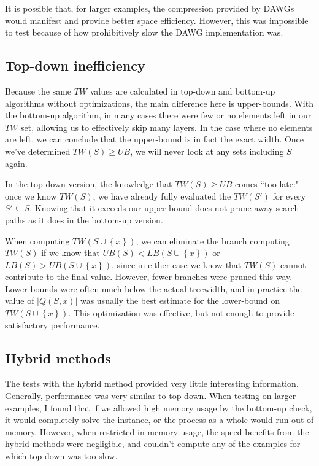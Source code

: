 \documentclass{article}
\newcommand\abs[1]{\left|#1\right|}
\newcommand\set[1]{\left\{#1\right\}}
\begin{document}
It is possible that, for larger examples, the compression provided by DAWGs would manifest
and provide better space efficiency. However, this was impossible to test because of how prohibitively
slow the DAWG implementation was.

\subsection{Top-down inefficiency}

Because the same $TW$ values are calculated in top-down and bottom-up
algorithms without optimizations, the main difference here is upper-bounds.
With the bottom-up algorithm, in many cases there were few or no elements
left in our $TW$ set, allowing us to effectively skip many layers. In the case
where no elements are left, we can conclude that the upper-bound is in fact the exact width.
Once we've determined $TW(S) \geq UB$, we will never look at any sets including $S$ again. 

In the top-down version, the knowledge that $TW(S) \geq UB$ comes ``too late:"
once we know $TW(S)$, we have already fully evaluated the $TW(S') $ for every $S' \subseteq S$.
Knowing that it exceeds our upper bound does not prune away search paths as it does in the bottom-up version.

When computing $TW(S \cup \set{x})$, we can eliminate the branch computing $TW(S)$ if
we know that $UB(S) < LB(S \cup \set{x})$ or $LB(S) > UB(S \cup \set{x})$, since in either case
we know that $TW(S)$ cannot contribute to the final value.
However, fewer branches were pruned this way.
Lower bounds were often much below the actual treewidth, and in practice the value of
$\abs{Q(S, x)}$ was usually the best estimate for the lower-bound on $TW(S \cup \set{x})$.
This optimization was effective, but not enough to provide satisfactory performance.

\subsection{Hybrid methods}

The tests with the hybrid method provided very little interesting information.
Generally, performance was very similar to top-down.
When testing on larger examples, I found that if we allowed high memory usage
by the bottom-up check, it would completely solve the instance, or
the process as a whole would run out of memory. However, when restricted
in memory usage, the speed benefits from the hybrid methods were negligible,
and couldn't compute any of the examples for which top-down was too slow.
\end{document}
